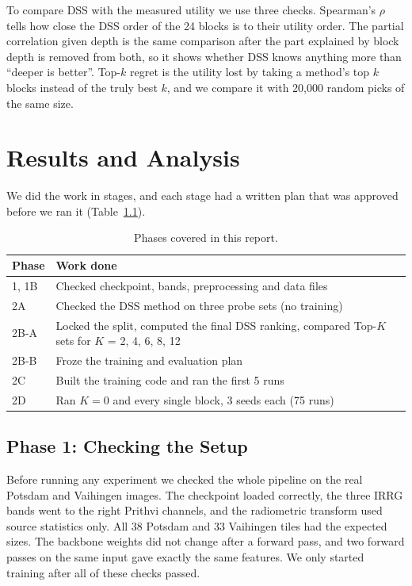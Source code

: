 \documentclass[11pt,a4paper]{report}
\begin{document}
To compare DSS with the measured utility we use three checks. Spearman's $\rho$ tells how close the DSS order of the 24 blocks is to their utility order. The partial correlation given depth is the same comparison after the part explained by block depth is removed from both, so it shows whether DSS knows anything more than ``deeper is better''. Top-$k$ regret is the utility lost by taking a method's top $k$ blocks instead of the truly best $k$, and we compare it with 20,000 random picks of the same size.

\chapter{Results and Analysis}
\label{ch:results}

We did the work in stages, and each stage had a written plan that was approved before we ran it (Table~\ref{tab:phases}).

\begin{table}[t]
\centering
\caption{Phases covered in this report.}
\label{tab:phases}
\small
\begin{tabular}{@{}lp{6.1cm}@{}}
\toprule
\textbf{Phase} & \textbf{Work done} \\
\midrule
1, 1B & Checked checkpoint, bands, preprocessing and data files \\
2A & Checked the DSS method on three probe sets (no training) \\
2B-A & Locked the split, computed the final DSS ranking, compared Top-$K$ sets for $K$ = 2, 4, 6, 8, 12 \\
2B-B & Froze the training and evaluation plan \\
2C & Built the training code and ran the first 5 runs \\
2D & Ran $K = 0$ and every single block, 3 seeds each (75 runs) \\
\bottomrule
\end{tabular}
\end{table}

\section{Phase 1: Checking the Setup}

Before running any experiment we checked the whole pipeline on the real Potsdam and Vaihingen images. The checkpoint loaded correctly, the three IRRG bands went to the right Prithvi channels, and the radiometric transform used source statistics only. All 38 Potsdam and 33 Vaihingen tiles had the expected sizes. The backbone weights did not change after a forward pass, and two forward passes on the same input gave exactly the same features. We only started training after all of these checks passed.
\end{document}
